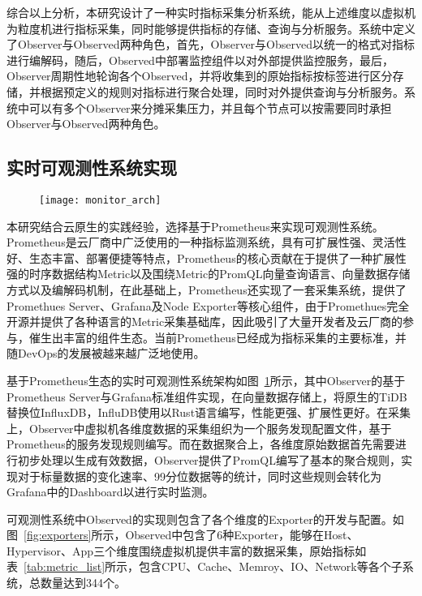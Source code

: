 综合以上分析，本研究设计了一种实时指标采集分析系统，能从上述维度以虚拟机为粒度机进行指标采集，同时能够提供指标的存储、查询与分析服务。系统中定义了Observer与Observed两种角色，首先，Observer与Observed以统一的格式对指标进行编解码，随后，Observed中部署监控组件以对外部提供监控服务，最后，Observer周期性地轮询各个Observed，并将收集到的原始指标按标签进行区分存储，并根据预定义的规则对指标进行聚合处理，同时对外提供查询与分析服务。系统中可以有多个Observer来分摊采集压力，并且每个节点可以按需要同时承担Observer与Observed两种角色。

\subsection{实时可观测性系统实现}


\begin{figure}[!htbp]
    \centering
    \texttt{[image: monitor\_arch]}
    \label{fig:monitor_arch}
\end{figure}

本研究结合云原生的实践经验，选择基于Prometheus来实现可观测性系统。Prometheus\citep{prometheus}是云厂商中广泛使用的一种指标监测系统，具有可扩展性强、灵活性好、生态丰富、部署便捷等特点，Prometheus的核心贡献在于提供了一种扩展性强的时序数据结构Metric以及围绕Metric的PromQL向量查询语言、向量数据存储方式以及编解码机制，在此基础上，Prometheus还实现了一套采集系统，提供了Promethues Server、Grafana及Node Exporter等核心组件，由于Promethues完全开源并提供了各种语言的Metric采集基础库，因此吸引了大量开发者及云厂商的参与，催生出丰富的组件生态。当前Prometheus已经成为指标采集的主要标准，并随DevOps的发展被越来越广泛地使用。

基于Prometheus生态的实时可观测性系统架构如图~\ref{fig:monitor_arch}所示，其中Observer的基于Prometheus Server与Grafana标准组件实现，在向量数据存储上，将原生的TiDB替换位InfluxDB，InfluDB使用以Rust语言编写，性能更强、扩展性更好。在采集上，Observer中虚拟机各维度数据的采集组织为一个服务发现配置文件，基于Prometheus的服务发现规则编写。而在数据聚合上，各维度原始数据首先需要进行初步处理以生成有效数据，Observer提供了PromQL编写了基本的聚合规则，实现对于标量数据的变化速率、99分位数据等的统计，同时这些规则会转化为Grafana中的Dashboard以进行实时监测。

可观测性系统中Observed的实现则包含了各个维度的Exporter的开发与配置。如图~\ref{fig:exporters}所示，Observed中包含了6种Exporter，能够在Host、Hypervisor、App三个维度围绕虚拟机提供丰富的数据采集，原始指标如表~\ref{tab:metric_list}所示，包含CPU、Cache、Memroy、IO、Network等各个子系统，总数量达到344个。

